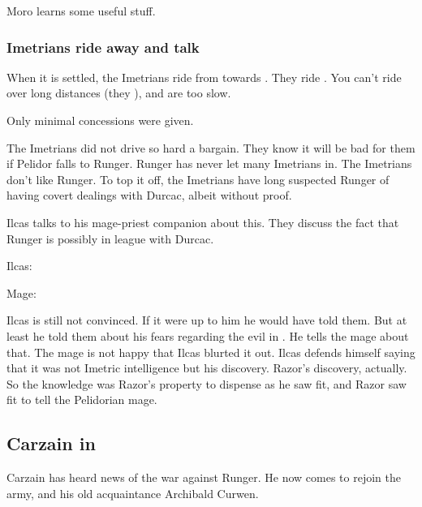 Moro learns some useful stuff. 





\subsubsection{Imetrians ride away and talk}
When it is settled, the Imetrians ride from \Malcur towards \Forclin. 
They ride \relcs. 
You can't ride \nycans{} over long distances (they ), and \mulgrons{} are too slow. 

Only minimal concessions were given. 

The Imetrians did not drive so hard a bargain. 
They know it will be bad for them if Pelidor falls to Runger. 
Runger has never let many Imetrians in. 
The Imetrians don't like Runger. 
To top it off, the Imetrians have long suspected Runger of having covert dealings with Durcac, albeit without proof. 

Ilcas talks to his mage-priest companion about this. 
They discuss the fact that Runger is possibly in league with Durcac. 

\begin{prose}
  Ilcas: 
  
  Mage: 
\end{prose}

Ilcas is still not convinced. 
If it were up to him he would have told them. 
But at least he told them about his fears regarding the evil in \Malcur. 
He tells the mage about that. 
The mage is not happy that Ilcas blurted it out. 
Ilcas defends himself saying that it was not Imetric intelligence but his discovery. 
Razor's discovery, actually. 
So the knowledge was Razor's property to dispense as he saw fit, and Razor saw fit to tell the Pelidorian mage. 









\subsection{Carzain in \Forclin}
Carzain \Shireyo{} has heard news of the war against Runger. 
He now comes to rejoin the army, and his old acquaintance Archibald Curwen. 

